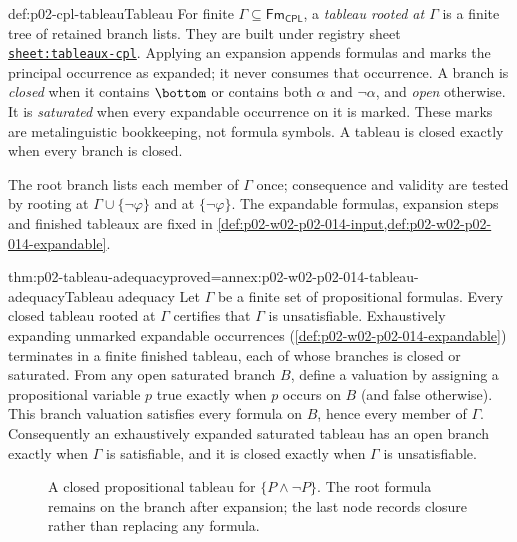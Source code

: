 \begin{hbdefinition}{def:p02-cpl-tableau}{Tableau}
For finite \(\Gamma\subseteq\mathsf{Fm}_{\mathsf{CPL}}\), a
\emph{tableau rooted at \(\Gamma\)} is a finite tree of retained branch
lists.  They are built under registry sheet
\hyperref[sheet:tableaux-cpl]{\texttt{sheet:tableaux-cpl}}.  Applying an
expansion appends formulas and marks the principal occurrence as expanded;
it never consumes that occurrence.  A branch is \emph{closed} when it
contains \(\bottom\) or contains both \(\alpha\) and \(\neg\alpha\), and
\emph{open} otherwise.  It is \emph{saturated} when every expandable
occurrence on it is marked.  These marks are metalinguistic bookkeeping, not
formula symbols.  A tableau is closed exactly when every branch is closed.

The root branch lists each member of \(\Gamma\) once; consequence and
validity are tested by rooting at \(\Gamma\cup\{\neg\varphi\}\) and at
\(\{\neg\varphi\}\).  The expandable formulas, expansion steps and finished
tableaux are fixed in
\cref{def:p02-w02-p02-014-input,def:p02-w02-p02-014-expandable}.
\end{hbdefinition}

\begin{hbtheorem}{thm:p02-tableau-adequacy}{proved=annex:p02-w02-p02-014-tableau-adequacy}{Tableau adequacy}
Let \(\Gamma\) be a finite set of propositional formulas.  Every closed
tableau rooted at \(\Gamma\) certifies that \(\Gamma\) is unsatisfiable.
Exhaustively expanding unmarked expandable occurrences
(\cref{def:p02-w02-p02-014-expandable}) terminates in a finite finished
tableau, each of whose branches is closed or saturated.  From any open saturated branch \(B\), define a valuation
by assigning a propositional variable \(p\) true exactly when \(p\) occurs
on \(B\) (and false otherwise).  This branch valuation satisfies every
formula on \(B\), hence every member of \(\Gamma\).  Consequently an
exhaustively expanded saturated tableau has an open branch
exactly when \(\Gamma\) is satisfiable, and it is closed exactly when
\(\Gamma\) is unsatisfiable.
\end{hbtheorem}

\begin{figure}[htbp]
\centering
{}
\caption{A closed propositional tableau for
\(\{P\land\neg P\}\).  The root formula remains on the branch
after expansion; the last node records closure rather than replacing any
formula.}
\label{fig:p02-closed-tableau}
\end{figure}

